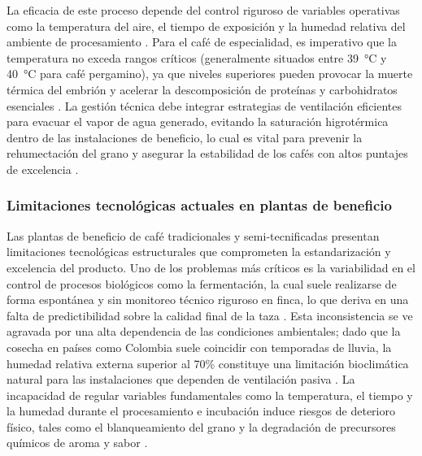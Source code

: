 La eficacia de este proceso depende del control riguroso de variables operativas como la temperatura del aire, el tiempo de exposición y la humedad relativa del ambiente de procesamiento \parencite{ferreira_bernardes_pereira_influence_2020, taveira_perfis_2012}. Para el café de especialidad, es imperativo que la temperatura no exceda rangos críticos (generalmente situados entre 39~°C y 40~°C para café pergamino), ya que niveles superiores pueden provocar la muerte térmica del embrión y acelerar la descomposición de proteínas y carbohidratos esenciales \parencite{carmo_quality_2020, osorio_hernandez_simulation_2015, taveira_perfis_2012}. La gestión técnica debe integrar estrategias de ventilación eficientes para evacuar el vapor de agua generado, evitando la saturación higrotérmica dentro de las instalaciones de beneficio, lo cual es vital para prevenir la rehumectación del grano y asegurar la estabilidad de los cafés con altos puntajes de excelencia \parencite{guerra_garcia_bioclimatic_2022, osorio_hernandez_computational_2020, osorio_hernandez_simulation_2015}.

\subsubsection{Limitaciones tecnológicas actuales en plantas de beneficio}

Las plantas de beneficio de café tradicionales y semi-tecnificadas presentan limitaciones tecnológicas estructurales que comprometen la estandarización y excelencia del producto. Uno de los problemas más críticos es la variabilidad en el control de procesos biológicos como la fermentación, la cual suele realizarse de forma espontánea y sin monitoreo técnico riguroso en finca, lo que deriva en una falta de predictibilidad sobre la calidad final de la taza \parencite{carmo_sensory_2020, polakova_changes_2022}. Esta inconsistencia se ve agravada por una alta dependencia de las condiciones ambientales; dado que la cosecha en países como Colombia suele coincidir con temporadas de lluvia, la humedad relativa externa superior al 70\% constituye una limitación bioclimática natural para las instalaciones que dependen de ventilación pasiva \parencite{osorio_hernandez_bioclimatic_2018, osorio_hernandez_simulation_2015}. La incapacidad de regular variables fundamentales como la temperatura, el tiempo y la humedad durante el procesamiento e incubación induce riesgos de deterioro físico, tales como el blanqueamiento del grano y la degradación de precursores químicos de aroma y sabor \parencite{osorio_hernandez_simulation_2015}.

